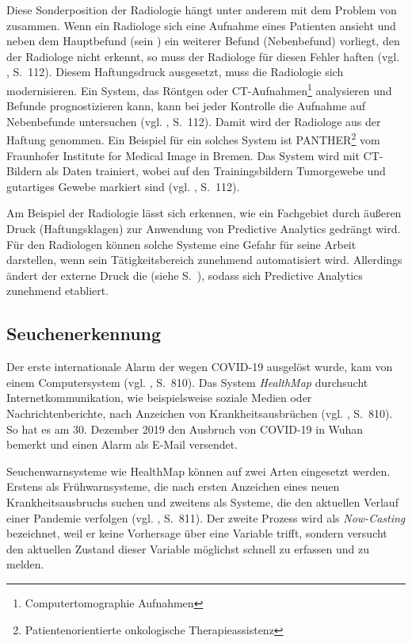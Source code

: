 Diese Sonderposition der Radiologie hängt unter anderem mit dem Problem von \grqq{} zusammen.
Wenn ein Radiologe sich eine Aufnahme eines Patienten ansieht und neben dem Hauptbefund (sein \grqq{})
ein weiterer Befund (Nebenbefund) vorliegt, den der Radiologe nicht erkennt, so muss der Radiologe für diesen Fehler haften
(vgl. \cite{Jorzig}, S.~112). Diesem Haftungsdruck ausgesetzt, muss die Radiologie sich modernisieren. Ein System,
das Röntgen oder CT-Aufnahmen\footnote{Computertomographie Aufnahmen} analysieren und Befunde prognostizieren kann, kann
bei jeder Kontrolle die Aufnahme auf Nebenbefunde untersuchen (vgl. \cite{Jorzig}, S.~112).
Damit wird der Radiologe aus der Haftung genommen. Ein Beispiel für ein solches System ist
PANTHER\footnote{Patientenorientierte onkologische Therapieassistenz} vom Fraunhofer Institute for Medical Image in Bremen.
Das System wird mit CT-Bildern als Daten trainiert, wobei auf den Trainingsbildern Tumorgewebe und gutartiges Gewebe markiert sind
(vgl. \cite{Jorzig}, S.~112).

Am Beispiel der Radiologie lässt sich erkennen, wie ein Fachgebiet durch äußeren Druck (Haftungsklagen) zur Anwendung von Predictive
Analytics gedrängt wird. Für den Radiologen können solche Systeme eine Gefahr für seine Arbeit darstellen, wenn sein Tätigkeitsbereich
zunehmend automatisiert wird. Allerdings ändert der externe Druck die \grqq{} (siehe S.~\xcom), sodass
sich Predictive Analytics zunehmend etabliert.

\subsection{Seuchenerkennung}

Der erste internationale Alarm der wegen COVID-19 ausgelöst wurde, kam von einem Computersystem (vgl. \cite{Cho}, S.~810).
Das System \emph{HealthMap} durchsucht Internetkommunikation, wie beispielsweise soziale Medien oder Nachrichtenberichte,
nach Anzeichen von Krankheitsausbrüchen (vgl. \cite{Cho}, S.~810). So hat es am 30. Dezember 2019 den Ausbruch von
COVID-19 in Wuhan bemerkt und einen Alarm als E-Mail versendet.

Seuchenwarnsysteme wie HealthMap können auf zwei Arten eingesetzt werden. Erstens als Frühwarnsysteme, die nach ersten
Anzeichen eines neuen Krankheitsausbruchs suchen und zweitens als Systeme, die den aktuellen Verlauf einer Pandemie
verfolgen (vgl. \cite{Cho}, S.~811). Der zweite Prozess wird als \emph{Now-Casting} bezeichnet, weil er keine Vorhersage
über eine Variable trifft, sondern versucht den aktuellen Zustand dieser Variable möglichst schnell zu erfassen und zu melden.

